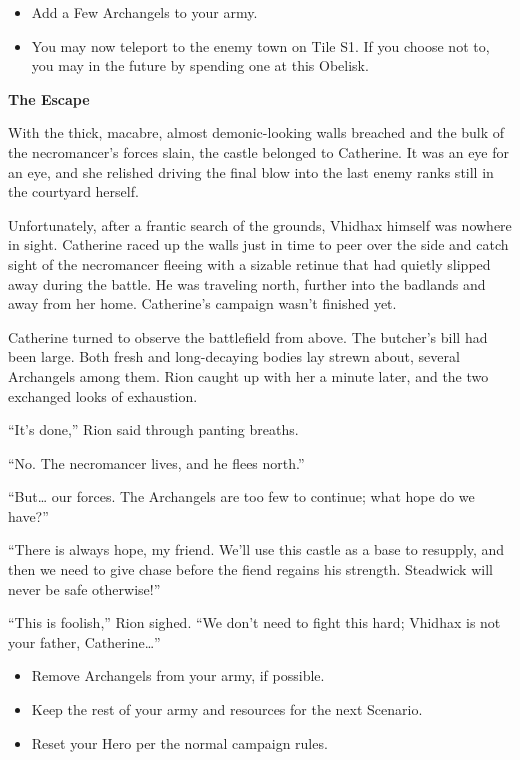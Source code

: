 \begin{multicols*}{2}
\begin{itemize}
  \item \textcolor{darkcandyapplered}{Add a Few Archangels to your army.}
  \item \textcolor{darkcandyapplered}{You may now teleport to the enemy town on Tile S1.
    If you choose not to, you may in the future by spending one  at this Obelisk.}
\end{itemize}


\textbf{The Escape}

With the thick, macabre, almost demonic-looking walls breached and the bulk of the necromancer's forces slain, the castle belonged to Catherine.
It was an eye for an eye, and she relished driving the final blow into the last enemy ranks still in the courtyard herself.

Unfortunately, after a frantic search of the grounds, Vhidhax himself was nowhere in sight.
Catherine raced up the walls just in time to peer over the side and catch sight of the necromancer fleeing with a sizable retinue that had quietly slipped away during the battle.
He was traveling north, further into the badlands and away from her home.
Catherine's campaign wasn't finished yet.

Catherine turned to observe the battlefield from above.
The butcher's bill had been large.
Both fresh and long-decaying bodies lay strewn about, several Archangels among them.
Rion caught up with her a minute later, and the two exchanged looks of exhaustion.

``It's done,'' Rion said through panting breaths.

``No.
The necromancer lives, and he flees north.''

``But… our forces.
The Archangels are too few to continue; what hope do we have?''

``There is always hope, my friend.
We'll use this castle as a base to resupply, and then we need to give chase before the fiend regains his strength.
Steadwick will never be safe otherwise!''

``This is foolish,'' Rion sighed.
``We don't need to fight this hard; Vhidhax is not your father, Catherine…''

\begin{itemize}
  \item \textcolor{darkcandyapplered}{Remove Archangels from your army, if possible.}
  \item \textcolor{darkcandyapplered}{Keep the rest of your army and resources for the next Scenario.}
  \item \textcolor{darkcandyapplered}{Reset your Hero per the normal campaign rules.}
\end{itemize}

\vspace{2em}
\begin{center}
\end{center}

\end{multicols*}
